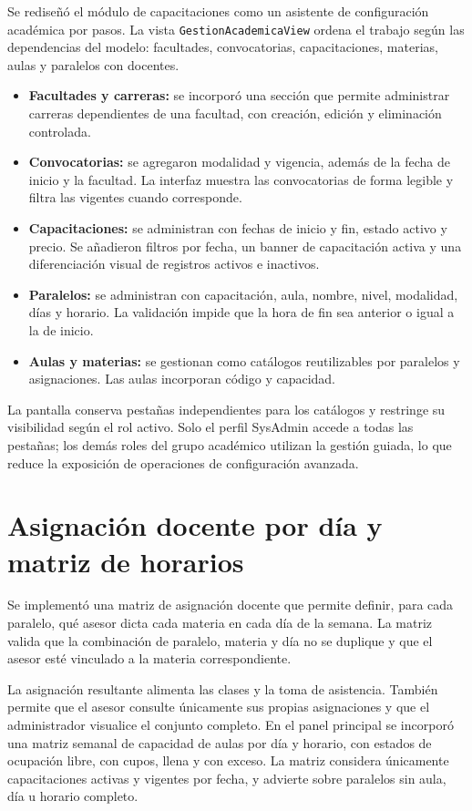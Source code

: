 \documentclass[12pt,a4paper,oneside]{report}
\begin{document}
Se rediseñó el módulo de capacitaciones como un asistente de configuración académica por pasos. La vista \texttt{GestionAcademicaView} ordena el trabajo según las dependencias del modelo: facultades, convocatorias, capacitaciones, materias, aulas y paralelos con docentes.

\begin{itemize}[leftmargin=1.5em]
  \item \textbf{Facultades y carreras:} se incorporó una sección que permite administrar carreras dependientes de una facultad, con creación, edición y eliminación controlada.
  \item \textbf{Convocatorias:} se agregaron modalidad y vigencia, además de la fecha de inicio y la facultad. La interfaz muestra las convocatorias de forma legible y filtra las vigentes cuando corresponde.
  \item \textbf{Capacitaciones:} se administran con fechas de inicio y fin, estado activo y precio. Se añadieron filtros por fecha, un banner de capacitación activa y una diferenciación visual de registros activos e inactivos.
  \item \textbf{Paralelos:} se administran con capacitación, aula, nombre, nivel, modalidad, días y horario. La validación impide que la hora de fin sea anterior o igual a la de inicio.
  \item \textbf{Aulas y materias:} se gestionan como catálogos reutilizables por paralelos y asignaciones. Las aulas incorporan código y capacidad.
\end{itemize}

La pantalla conserva pestañas independientes para los catálogos y restringe su visibilidad según el rol activo. Solo el perfil SysAdmin accede a todas las pestañas; los demás roles del grupo académico utilizan la gestión guiada, lo que reduce la exposición de operaciones de configuración avanzada.

\section{Asignación docente por día y matriz de horarios}

Se implementó una matriz de asignación docente que permite definir, para cada paralelo, qué asesor dicta cada materia en cada día de la semana. La matriz valida que la combinación de paralelo, materia y día no se duplique y que el asesor esté vinculado a la materia correspondiente.

La asignación resultante alimenta las clases y la toma de asistencia. También permite que el asesor consulte únicamente sus propias asignaciones y que el administrador visualice el conjunto completo. En el panel principal se incorporó una matriz semanal de capacidad de aulas por día y horario, con estados de ocupación libre, con cupos, llena y con exceso. La matriz considera únicamente capacitaciones activas y vigentes por fecha, y advierte sobre paralelos sin aula, día u horario completo.
\end{document}
